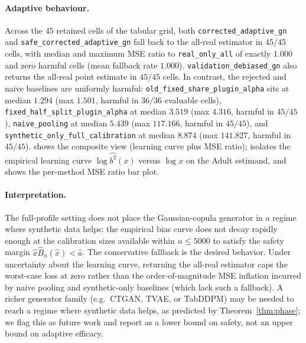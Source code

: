 \paragraph{Adaptive behaviour.} Across the $45$ retained cells of the tabular grid, both \texttt{corrected\_adaptive\_gn} and \texttt{safe\_corrected\_adaptive\_gn} fall back to the all-real estimator in $45/45$ cells, with median and maximum MSE ratio to \texttt{real\_only\_all} of exactly $1.000$ and zero harmful cells (mean fallback rate $1.000$). \texttt{validation\_debiased\_gn} also returns the all-real point estimate in $45/45$ cells. In contrast, the rejected and naive baselines are uniformly harmful: \texttt{old\_fixed\_share\_plugin\_alpha} sits at median $1.294$ (max $1.501$, harmful in $36/36$ evaluable cells), \texttt{fixed\_half\_split\_plugin\_alpha} at median $3.519$ (max $4.316$, harmful in $45/45$), \texttt{naive\_pooling} at median $5.439$ (max $117.166$, harmful in $45/45$), and \texttt{synthetic\_only\_full\_calibration} at median $8.874$ (max $141.827$, harmful in $45/45$).  shows the composite view (learning curve plus MSE ratio);  isolates the empirical learning curve $\log\widehat{b^2}(x)$ versus $\log x$ on the Adult estimand, and  shows the per-method MSE ratio bar plot.

\paragraph{Interpretation.} The full-profile setting does not place the Gaussian-copula generator in a regime where synthetic data helps: the empirical bias curve does not decay rapidly enough at the calibration sizes available within $n \le 5000$ to satisfy the safety margin $\hat x \widehat B_n(\hat x) < \hat a$. The conservative fallback is the desired behavior. Under uncertainty about the learning curve, returning the all-real estimator caps the worst-case loss at zero rather than the order-of-magnitude MSE inflation incurred by naive pooling and synthetic-only baselines (which lack such a fallback). A richer generator family (e.g.\ CTGAN, TVAE, or TabDDPM) may be needed to reach a regime where synthetic data helps, as predicted by Theorem~\ref{thm:phase}; we flag this as future work and report  as a lower bound on safety, not an upper bound on adaptive efficacy.

